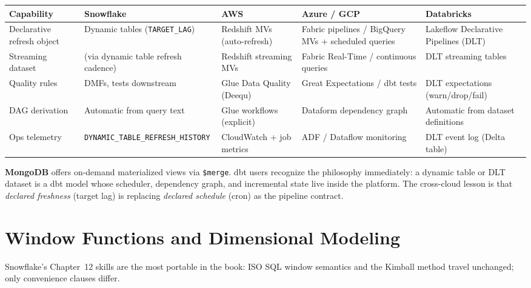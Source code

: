 \begin{center}
\footnotesize
\begin{tabular}{@{}p{2.5cm}p{2.9cm}p{2.7cm}p{2.9cm}p{2.9cm}@{}}
\toprule
\textbf{Capability} & \textbf{Snowflake} & \textbf{AWS} & \textbf{Azure / GCP} & \textbf{Databricks} \\
\midrule
Declarative refresh object & Dynamic tables (\texttt{TARGET\_LAG}) & Redshift MVs (auto-refresh) & Fabric pipelines / BigQuery MVs + scheduled queries & Lakeflow Declarative Pipelines (DLT) \\
Streaming dataset & (via dynamic table refresh cadence) & Redshift streaming MVs & Fabric Real-Time / continuous queries & DLT streaming tables \\
Quality rules & DMFs, tests downstream & Glue Data Quality (Deequ) & Great Expectations / dbt tests & DLT expectations (warn/drop/fail) \\
DAG derivation & Automatic from query text & Glue workflows (explicit) & Dataform dependency graph & Automatic from dataset definitions \\
Ops telemetry & \texttt{DYNAMIC\_TABLE\_REFRESH\_HISTORY} & CloudWatch + job metrics & ADF / Dataflow monitoring & DLT event log (Delta table) \\
\bottomrule
\end{tabular}
\end{center}

\noindent \textbf{MongoDB} offers on-demand materialized views via \texttt{\$merge}. dbt users
recognize the philosophy immediately: a dynamic table or DLT dataset is a dbt model whose
scheduler, dependency graph, and incremental state live inside the platform. The cross-cloud
lesson is that \emph{declared freshness} (target lag) is replacing \emph{declared schedule}
(cron) as the pipeline contract.

\section{Window Functions and Dimensional Modeling}
%
Snowflake's Chapter~12 skills are the most portable in the book: ISO SQL window semantics and the
Kimball method travel unchanged; only convenience clauses differ.

